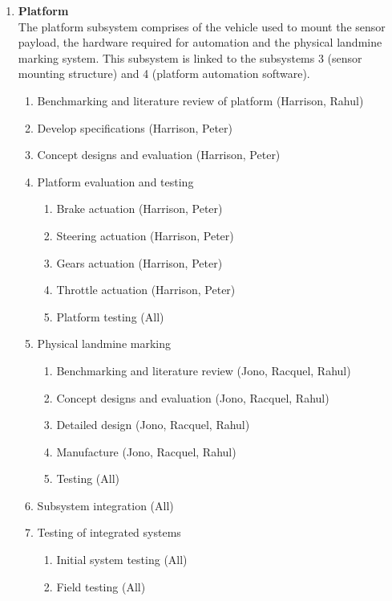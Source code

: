 \documentclass[main.tex]{subfiles}
\begin{document}
\begin{appendices}
{
\begin{enumerate}
\item \textbf{Platform}\\
The platform subsystem comprises of the vehicle used to mount the sensor payload, the hardware required for automation and the physical landmine marking system. This subsystem is linked to the subsystems 3 (sensor mounting structure) and 4 (platform automation software).
	\begin{enumerate}[label*=\arabic*.]
	\item Benchmarking and literature review of platform (Harrison, Rahul)
    \item Develop specifications (Harrison, Peter)
    \item Concept designs and evaluation (Harrison, Peter)
	\item Platform evaluation and testing
    	\begin{enumerate}[label*=\arabic*.]
		\item Brake actuation (Harrison, Peter)
        \item Steering actuation (Harrison, Peter)
        \item Gears actuation (Harrison, Peter)
        \item Throttle actuation (Harrison, Peter)
        \item Platform testing (All)
        \end{enumerate}
    \item Physical landmine marking
    	\begin{enumerate}[label*=\arabic*.]
		\item Benchmarking and literature review (Jono, Racquel, Rahul)
        \item Concept designs and evaluation (Jono, Racquel, Rahul)
        \item Detailed design (Jono, Racquel, Rahul)
        \item Manufacture (Jono, Racquel, Rahul)
        \item Testing (All)
        \end{enumerate}
    \item Subsystem integration (All)
    \item Testing of integrated systems
    	\begin{enumerate}[label*=\arabic*.]
		\item Initial system testing (All)
        \item Field testing (All)
        \end{enumerate}
	\end{enumerate}
    

\end{enumerate}}
\end{appendices}
\end{document}
